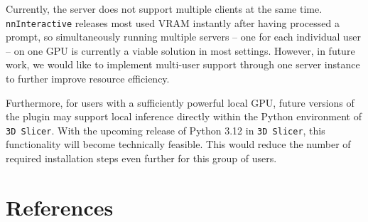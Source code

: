 \documentclass[
]{article}
\begin{document}
Currently, the server does not support multiple clients at the same
time. \texttt{nnInteractive} releases most used VRAM instantly after
having processed a prompt, so simultaneously running multiple servers --
one for each individual user -- on one GPU is currently a viable
solution in most settings. However, in future work, we would like to
implement multi-user support through one server instance to further
improve resource efficiency.

Furthermore, for users with a sufficiently powerful local GPU, future
versions of the plugin may support local inference directly within the
Python environment of \texttt{3D\ Slicer}. With the upcoming release of
Python 3.12 in \texttt{3D\ Slicer}, this functionality will become
technically feasible. This would reduce the number of required
installation steps even further for this group of users.

\section*{References}\label{references}
\end{document}
